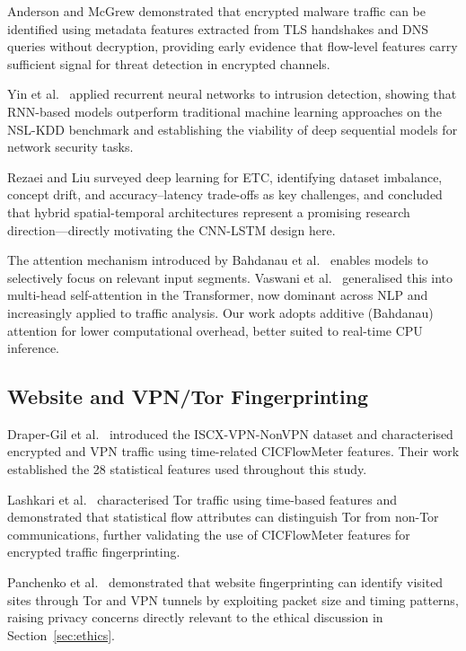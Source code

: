 \documentclass[conference]{IEEEtran}
\begin{document}
Anderson and McGrew \cite{anderson2016} demonstrated that encrypted malware
traffic can be identified using metadata features extracted from TLS
handshakes and DNS queries without decryption, providing early evidence that
flow-level features carry sufficient signal for threat detection in encrypted
channels.

Yin et al.\ \cite{yin2017} applied recurrent neural networks to intrusion
detection, showing that RNN-based models outperform traditional machine
learning approaches on the NSL-KDD benchmark and establishing the viability
of deep sequential models for network security tasks.

Rezaei and Liu \cite{rezaei2019} surveyed deep learning for ETC, identifying
dataset imbalance, concept drift, and accuracy--latency trade-offs as key
challenges, and concluded that hybrid spatial-temporal architectures represent
a promising research direction---directly motivating the CNN-LSTM design here.

The attention mechanism introduced by Bahdanau et al.\ \cite{bahdanau2015}
enables models to selectively focus on relevant input segments. Vaswani et al.\
\cite{vaswani2017} generalised this into multi-head self-attention in the
Transformer, now dominant across NLP and increasingly applied to traffic
analysis. Our work adopts additive (Bahdanau) attention for lower computational
overhead, better suited to real-time CPU inference.

\subsection{Website and VPN/Tor Fingerprinting}

Draper-Gil et al.\ \cite{draper2016} introduced the ISCX-VPN-NonVPN dataset
and characterised encrypted and VPN traffic using time-related CICFlowMeter
features. Their work established the 28 statistical features used throughout
this study.

Lashkari et al.\ \cite{lashkari2017} characterised Tor traffic using
time-based features and demonstrated that statistical flow attributes can
distinguish Tor from non-Tor communications, further validating the use of
CICFlowMeter features for encrypted traffic fingerprinting.

Panchenko et al.\ \cite{panchenko2016} demonstrated that website fingerprinting
can identify visited sites through Tor and VPN tunnels by exploiting packet size
and timing patterns, raising privacy concerns directly relevant to the ethical
discussion in Section~\ref{sec:ethics}.
\end{document}
